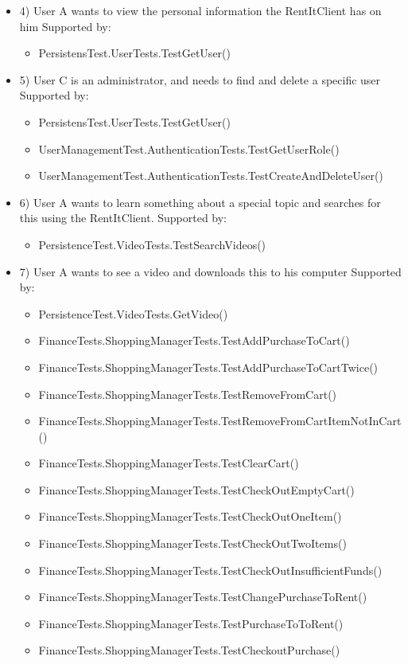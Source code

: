 \begin{itemize}
\item 4)
User A wants to view the personal information the  RentItClient has on him
\newline Supported by:
\begin{itemize}
\item PersistensTest.UserTests.TestGetUser()
\end{itemize}

\item 5)
User C is an administrator, and needs to find and delete a specific user
\newline Supported by:
\begin{itemize}
\item PersistensTest.UserTests.TestGetUser()
\item UserManagementTest.AuthenticationTests.TestGetUserRole()
\item UserManagementTest.AuthenticationTests.TestCreateAndDeleteUser()
\end{itemize}

\item 6) 
User A wants to learn something about a special topic and searches for this using the RentItClient. 
\newline Supported by:
\begin{itemize}
\item PersistenceTest.VideoTests.TestSearchVideos()
\end{itemize}

\item 7)
User A wants to see a video and downloads this to his computer
\newline Supported by:
\begin{itemize}
\item PersistenceTest.VideoTests.GetVideo()
\item FinanceTests.ShoppingManagerTests.TestAddPurchaseToCart()
\item FinanceTests.ShoppingManagerTests.TestAddPurchaseToCartTwice()
\item FinanceTests.ShoppingManagerTests.TestRemoveFromCart()
\item FinanceTests.ShoppingManagerTests.TestRemoveFromCartItemNotInCart()
\item FinanceTests.ShoppingManagerTests.TestClearCart()
\item FinanceTests.ShoppingManagerTests.TestCheckOutEmptyCart()
\item FinanceTests.ShoppingManagerTests.TestCheckOutOneItem()
\item FinanceTests.ShoppingManagerTests.TestCheckOutTwoItems()
\item FinanceTests.ShoppingManagerTests.TestCheckOutInsufficientFunds()
\item FinanceTests.ShoppingManagerTests.TestChangePurchaseToRent()
\item FinanceTests.ShoppingManagerTests.TestPurchaseToToRent()
\item FinanceTests.ShoppingManagerTests.TestCheckoutPurchase()
\end{itemize}


\end{itemize}
